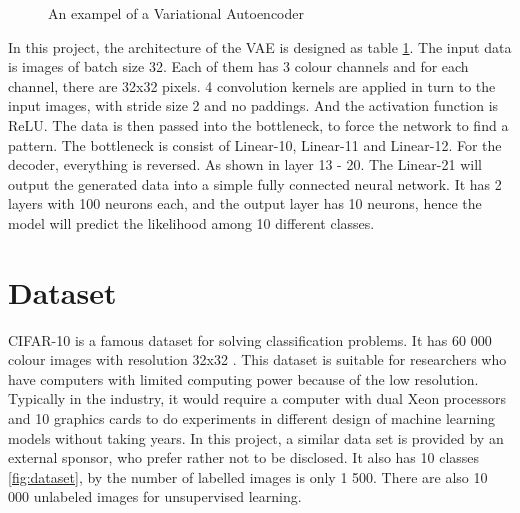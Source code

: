 \documentclass[11pt,a4paper]{report}
\begin{document}
\begin{figure}[h!]
\noindent{}
\caption{An exampel of a Variational Autoencoder}
  \label{tab:model}
\end{figure}

In this project, the architecture of the VAE is designed as table \ref{tab:model}. The input data is images of batch size 32. Each of them has 3 colour channels and for each channel, there are 32x32 pixels. 4 convolution kernels are applied in turn to the input images, with stride size 2 and no paddings. And the activation function is ReLU. The data is then passed into the bottleneck, to force the network to find a pattern. The bottleneck is consist of Linear-10, Linear-11 and Linear-12. For the decoder, everything is reversed. As shown in layer 13 - 20. The Linear-21 will output the generated data into a simple fully connected neural network. It has 2 layers with 100 neurons each, and the output layer has 10 neurons, hence the model will predict the likelihood among 10 different classes.


\section{Dataset}
\label{sec:data}

CIFAR-10 is a famous dataset for solving classification problems. It has 60 000 colour images with resolution 32x32 \cite{cifar10}. This dataset is suitable for researchers who have computers with limited computing power because of the low resolution. Typically in the industry, it would require a computer with dual Xeon processors and 10 graphics cards to do experiments in different design of machine learning models without taking years. In this project, a similar data set is provided by an external sponsor, who prefer rather not to be disclosed. It also has 10 classes \ref{fig:dataset}, by the number of labelled images is only 1 500. There are also 10 000 unlabeled images for unsupervised learning.
\end{document}
